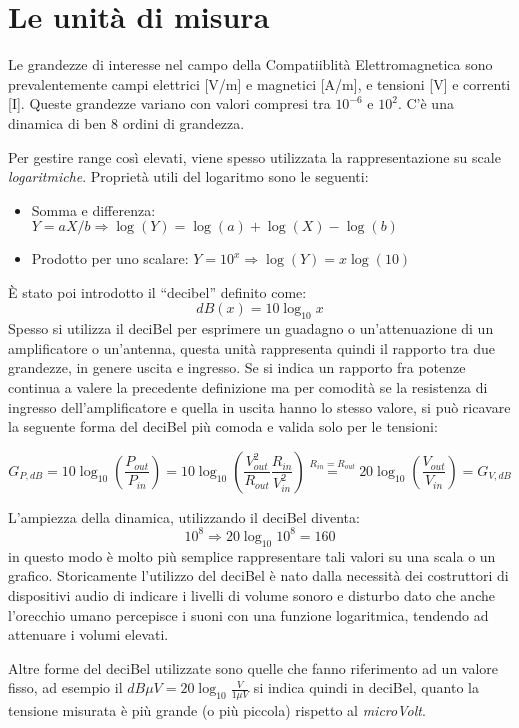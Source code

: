\section{Le unità di misura}
Le grandezze di interesse nel campo della Compatiiblità Elettromagnetica sono prevalentemente
campi elettrici [V/m] e magnetici [A/m], e tensioni [V] e correnti [I].
Queste grandezze variano con valori compresi tra $10^{-6}$ e $10^{2}$. C'è una dinamica di ben 8 ordini di grandezza.

Per gestire range così elevati, viene spesso utilizzata la rappresentazione su scale \textit{logaritmiche}.
Proprietà utili del logaritmo sono le seguenti:
\begin{itemize}
 \item [] Somma e differenza: $Y = aX/b \Rightarrow \log(Y) = \log(a) + \log(X) - \log(b) $
 \item [] Prodotto per uno scalare: $Y = 10^x \Rightarrow \log(Y) = x\log(10) $
\end{itemize}

È stato poi introdotto il ``decibel'' definito come:
$$\si{dB}(x) = 10\log_{10}x $$
Spesso si utilizza il deciBel per esprimere un guadagno o un'attenuazione di un amplificatore o un'antenna,
questa unità rappresenta quindi il rapporto tra due grandezze, in genere uscita e ingresso.
Se si indica un rapporto fra potenze continua a valere la precedente definizione ma per comodità
se la resistenza di ingresso dell'amplificatore e quella in uscita hanno lo stesso valore, si può ricavare
la seguente forma del deciBel più comoda e valida solo per le tensioni:

$$G_{P,\si{dB}} = 10\log_{10}\left(\frac{P_{out}}{P_{in}} \right) = 
10\log_{10}\left( \frac{V_{out}^2}{R_{out}}\frac{R_{in}}{V_{in}^2} \right) \stackrel{R_{in} = R_{out}}{=}
20\log_{10}\left(\frac{V_{out}}{V_{in}}\right) = G_{V,\si{dB}} $$

L'ampiezza della dinamica, utilizzando il deciBel diventa:
$$10^8 \Rightarrow 20\log_{10}10^8 = 160$$
in questo modo è molto più semplice rappresentare tali valori su una scala o un grafico.
Storicamente l'utilizzo del deciBel è nato dalla necessità dei costruttori di dispositivi audio di indicare
i livelli di volume sonoro e disturbo dato che anche l'orecchio umano percepisce i suoni con una funzione
logaritmica, tendendo ad attenuare i volumi elevati.

Altre forme del deciBel utilizzate sono quelle che fanno riferimento ad un valore fisso,
ad esempio il $\si{dB}\mu V = 20\log_{10}\frac{V}{1 \mu V}$ si indica quindi in deciBel, quanto la tensione
misurata è più grande (o più piccola) rispetto al \textit{microVolt}.

